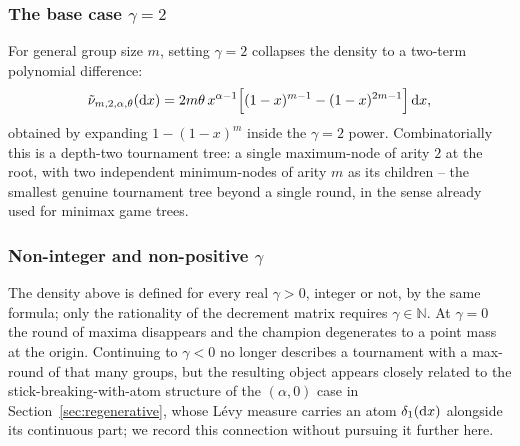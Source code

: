 \documentclass[11pt]{article}
\newcommand{\NN}{\mathbb{N}}
\theoremstyle{plain}
\theoremstyle{definition}
\begin{document}
\subsubsection{The base case \(\gamma=2\)} For general group size \(m\), setting \(\gamma=2\) collapses the density to a two-term polynomial difference:
\[
\tilde\nu_{m,2,\alpha,\theta}({\rm d}x)=2m\theta\,x^{\alpha-1}\Bigl[(1-x)^{m-1}-(1-x)^{2m-1}\Bigr]\,{\rm d}x,
\]
obtained by expanding \(1-(1-x)^m\) inside the \(\gamma=2\) power. Combinatorially this is a depth-two tournament tree: a single maximum-node of arity \(2\) at the root, with two independent minimum-nodes of arity \(m\) as its children -- the smallest genuine tournament tree beyond a single round, in the sense already used for minimax game trees.

\subsubsection{Non-integer and non-positive \(\gamma\)} The density above is defined for every real \(\gamma>0\), integer or not, by the same formula; only the rationality of the decrement matrix requires \(\gamma\in\NN\). At \(\gamma=0\) the round of maxima disappears and the champion degenerates to a point mass at the origin. Continuing to \(\gamma<0\) no longer describes a tournament with a max-round of that many groups, but the resulting object appears closely related to the stick-breaking-with-atom structure of the \((\alpha,0)\) case in Section~\ref{sec:regenerative}, whose Lévy measure carries an atom \(\delta_1({\rm d}x)\) alongside its continuous part; we record this connection without pursuing it further here.
\end{document}

